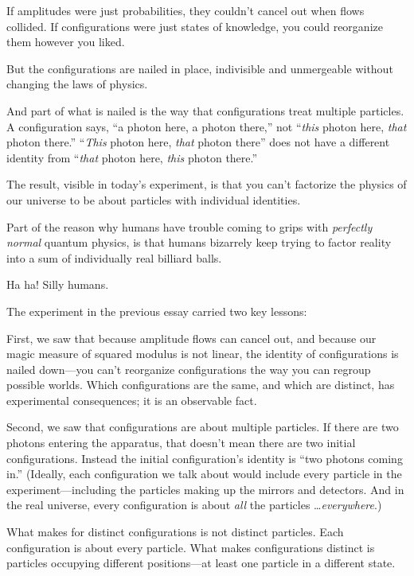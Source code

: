 {
 If amplitudes were just probabilities, they
couldn't cancel out when flows collided. If
configurations were just states of knowledge, you could reorganize them
however you liked.}

{
 But the configurations are nailed in place, indivisible and
unmergeable without changing the laws of physics.}

{
 And part of what is nailed is the way that configurations treat
multiple particles. A configuration says, ``a photon
here, a photon there,'' not
``\textit{this} photon here, \textit{that} photon
there.'' ``\textit{This} photon
here, \textit{that} photon there'' does not have a
different identity from ``\textit{that} photon here,
\textit{this} photon there.''}

{
 The result, visible in today's experiment, is that
you can't factorize the physics of our universe to be
about particles with individual identities.}

{
 Part of the reason why humans have trouble coming to grips with
\textit{perfectly normal} quantum physics, is that humans bizarrely
keep trying to factor reality into a sum of individually real billiard
balls.}

{
 Ha ha! Silly humans.}

\myendsectiontext


{
 The experiment in the previous essay carried two key lessons: }

{
 First, we saw that because amplitude flows can cancel out, and
because our magic measure of squared modulus is not linear, the
identity of configurations is nailed down---you can't
reorganize configurations the way you can regroup possible worlds.
Which configurations are the same, and which are distinct, has
experimental consequences; it is an observable fact.}

{
 Second, we saw that configurations are about multiple particles.
If there are two photons entering the apparatus, that
doesn't mean there are two initial configurations.
Instead the initial configuration's identity is
``two photons coming in.'' (Ideally,
each configuration we talk about would include every particle in the
experiment---including the particles making up the mirrors and
detectors. And in the real universe, every configuration is about
\textit{all} the particles \ldots \textit{everywhere}.)}

{
 What makes for distinct configurations is not distinct particles.
Each configuration is about every particle. What makes configurations
distinct is particles occupying different positions---at least one
particle in a different state.}

